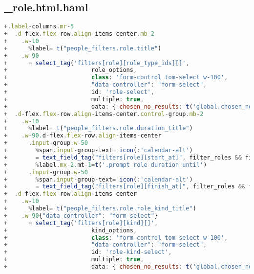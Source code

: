 \newpage

\subsection{\_role.html.haml}
\begin{lstlisting}[language=JavaScript]
+.label-columns.mr-5
+  .d-flex.flex-row.align-items-center.mb-2
+    .w-10
+      %label= t("people_filters.role.title")
+    .w-90
+      = select_tag('filters[role][role_type_ids][]',
+                        role_options,
+                        class: 'form-control tom-select w-100',
+                        "data-controller": "form-select",
+                        id: 'role-select',
+                        multiple: true,
+                        data: { chosen_no_results: t('global.chosen_no_results'), placeholder: t('.prompt_role_placeholder') } )
+  .d-flex.flex-row.align-items-center.control-group.mb-2
+    .w-10
+      %label= t("people_filters.role.duration_title")
+    .w-90.d-flex.flex-row.align-items-center
+      .input-group.w-50
+        %span.input-group-text= icon(:'calendar-alt')
+        = text_field_tag("filters[role][start_at]", filter_roles && filter_roles.args[:start_at], class: 'date form-control')
+        %label.mx-2.mt-1=t('.prompt_role_duration_until')
+      .input-group.w-50
+        %span.input-group-text= icon(:'calendar-alt')
+        = text_field_tag("filters[role][finish_at]", filter_roles && filter_roles.args[:finish_at], class: 'date form-control')
+  .d-flex.flex-row.align-items-center
+    .w-10
+      %label= t("people_filters.role.role_kind_title")
+    .w-90{"data-controller": "form-select"}
+      = select_tag('filters[role][kind][]',
+                        kind_options,
+                        class: 'form-control tom-select w-100',
+                        "data-controller": "form-select",
+                        id: 'role-kind-select',
+                        multiple: true,
+                        data: { chosen_no_results: t('global.chosen_no_results'), placeholder: t('.prompt_role_kind_placeholder') } )

\end{lstlisting}

\newpage

